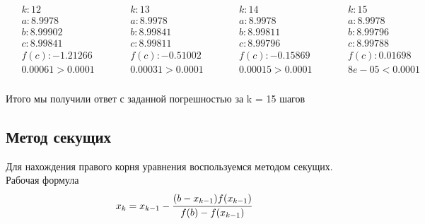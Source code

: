 \documentclass[letterpaper, 11pt]{extarticle}
\begin{document}
\begin{align*}
    \begin{aligned}
        & k: 12 \\
        & a: 8.9978 \\
        & b: 8.99902 \\
        & c: 8.99841 \\
        & f(c): -1.21266 \\
        & 0.00061 > 0.0001
    \end{aligned}
    \qquad
    \begin{aligned}
        & k: 13 \\
        & a: 8.9978 \\
        & b: 8.99841 \\
        & c: 8.99811 \\
        & f(c): -0.51002 \\
        & 0.00031 > 0.0001
    \end{aligned}
    \qquad
    \begin{aligned}
        & k: 14 \\
        & a: 8.9978 \\
        & b: 8.99811 \\
        & c: 8.99796 \\
        & f(c): -0.15869 \\
        & 0.00015 > 0.0001
    \end{aligned}
    \qquad
    \begin{aligned}
        & k: 15 \\
        & a: 8.9978 \\
        & b: 8.99796 \\
        & c: 8.99788 \\
        & f(c): 0.01698 \\
        & 8e-05 < 0.0001
    \end{aligned}
\end{align*}\\

\noindent Итого мы получили ответ с заданной погрешностью за k = 15 шагов

\subsection*{Метод секущих}
Для нахождения правого корня уравнения воспользуемся методом секущих.\\
Рабочая формула
\begin{equation*}
    x_k = x_{k-1} - \cfrac{(b - x_{k-1})f(x_{k-1})}{f(b)-f(x_{k-1})}
\end{equation*}
\end{document}
